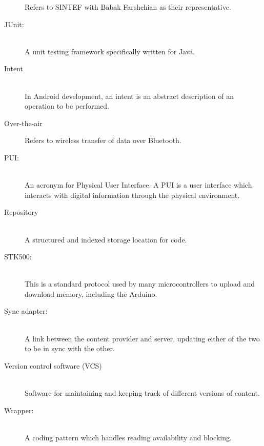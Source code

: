 \begin{description}
		Refers to SINTEF with Babak Farshchian as their representative.
	\item[JUnit:]\hfill \\
		A unit testing framework specifically written for Java.
	\item[Intent] \hfill \\
		In Android development, an intent is an abstract description of an operation to be performed.
	\item[Over-the-air]
		Refers to wireless transfer of data over Bluetooth.
	\item[PUI:]\hfill \\
		An acronym for Physical User Interface. A PUI is a user interface which interacts with digital information through the physical environment.
	\item[Repository]\hfill \\
		A structured and indexed storage location for code.
	\item[STK500:]\hfill \\
		This is a standard protocol used by many microcontrollers to upload and download memory, including the Arduino.
	\item[Sync adapter:]\hfill \\
		A link between the content provider and server, updating either of the two to be in sync with the other.
	\item[Version control software (VCS)]\hfill \\
		Software for maintaining and keeping track of different versions of content.
	\item[Wrapper:]\hfill \\
		A coding pattern which handles reading availability and blocking.
\end{description}


